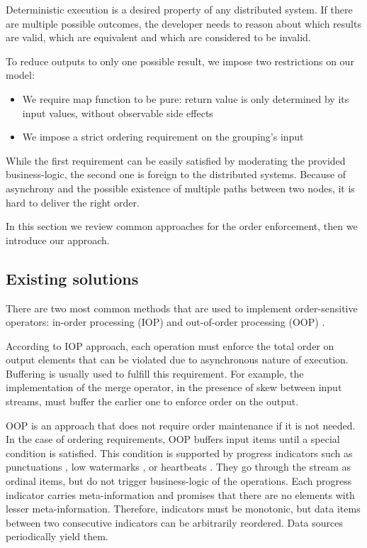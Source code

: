 \label {fs-collision}

Deterministic execution is a desired property of any distributed system. If there are multiple possible outcomes, the developer needs to reason about which results are valid, which are equivalent and which are considered to be invalid.

To reduce outputs to only one possible result, we impose two restrictions on our model: 

\begin{itemize}
  \item We require map function to be pure: return value is only determined by its input values, without observable side effects
  \item We impose a strict ordering requirement on the grouping's input
\end{itemize}

While the first requirement can be easily satisfied by moderating the provided business-logic, the second one is foreign to the distributed systems. Because of asynchrony and the possible existence of multiple paths between two nodes, it is hard to deliver the right order. 

In this section we review common approaches for the order enforcement, then we introduce our approach.

\subsection{Existing solutions}

There are two most common methods that are used to implement order-sensitive operators: in-order processing (IOP) \cite{Arasu:2006:CCQ:1146461.1146463, Cranor:2003:GSD:872757.872838} and out-of-order processing (OOP) \cite{Li:2008:OPN:1453856.1453890}.

According to IOP approach, each operation must enforce the total order on output elements that can be violated due to asynchronous nature of execution. Buffering is usually used to fulfill this requirement. For example, the implementation of the merge operator, in the presence of skew between input streams, must buffer the earlier one to enforce order on the output.

OOP is an approach that does not require order maintenance if it is not needed. In the case of ordering requirements, OOP buffers input items until a special condition is satisfied. This condition is supported by progress indicators such as punctuations \cite{Tucker:2003:EPS:776752.776780}, low watermarks \cite{Akidau:2013:MFS:2536222.2536229}, or heartbeats \cite{Srivastava:2004:FTM:1055558.1055596}. They go through the stream as ordinal items, but do not trigger business-logic of the operations. Each progress indicator carries meta-information and promises that there are no elements with lesser meta-information. Therefore, indicators must be monotonic, but data items between two consecutive indicators can be arbitrarily reordered. Data sources periodically yield them.

